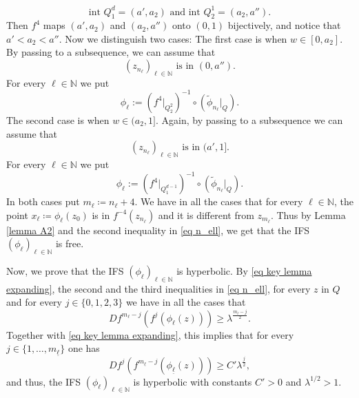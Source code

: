 \documentclass[12pt]{amsart}
\numberwithin{equation}{section} %
\numberwithin{figure}{section} %
\theoremstyle{plain}
\theoremstyle{definition}
\theoremstyle{remark}
\theoremstyle{citing}
\newcommand{\N}{\mathbb{N}}
\renewcommand{\=}{\coloneqq}
\begin{document}
    \begin{equation}
        \text{int } Q_1^d = (a',a_2) \text{ and }\text{int }Q_2^1=(a_2,a''). 
    \end{equation}
    Then $f^4$ maps $(a',a_2)$ and $(a_2,a'')$ onto $(0,1)$ bijectively, and notice that $a'<a_2<a''$. Now we distinguish two cases: The first case is when $w\in[0,a_2]$. By passing to a subsequence, we can assume that
    \begin{equation}
        (z_{n_\ell})_{\ell\in\N} \text{ is in } (0,a'').
    \end{equation}
    For every $\ell\in\N$ we put
    \begin{equation}
        \phi_\ell:= (f^4|_{Q_2^2})^{-1}\circ (\widetilde{\phi}_{n_\ell}|_Q).
    \end{equation}
    The second case is when $w\in (a_2,1]$. Again, by passing to a subsequence we can assume that 
    \begin{equation}
        (z_{n_\ell})_{\ell\in\N} \text{ is in }(a',1].
    \end{equation}
    For every $\ell\in\N$ we put
    \begin{equation}
        \phi_\ell:= (f^4|_{Q_1^{d-1}})^{-1}\circ (\widetilde{\phi}_{n_\ell}|_Q).
    \end{equation}
In both cases put $m_\ell\=n_\ell +4$. We have in all the cases that for every $\ell\in\N$, the point $x_\ell \= \phi_\ell(z_0)$ is in $f^{-4}(z_{n_\ell})$ and it is different from $z_{m_\ell}$. Thus by Lemma \ref{lemma A2} and the second inequality in \eqref{eq n_ell}, we get that the IFS $(\phi_\ell)_{\ell\in\N}$ is free.

Now, we prove that the IFS $(\phi_\ell)_{\ell\in\N}$ is hyperbolic. By 
\eqref{eq key lemma expanding}, the second and the third inequalities in \eqref{eq n_ell}, for every $z$ in $Q$ and for every $j\in\{0,1,2,3\}$ we have in all the cases that 
\begin{equation}
    Df^{m_\ell -j}(f^j(\phi_\ell(z))) \geq \lambda^{\frac{m_\ell-j}{2}}.
\end{equation}
Together with \eqref{eq key lemma expanding}, this implies that for every $j\in\{1,\ldots,m_{\underline{\ell}}\}$ one has
\begin{equation}
    Df^j(f^{m_{\underline{\ell}}-j}(\phi_{\underline{\ell}}(z)))\geq C'\lambda ^{\frac{j}{2}},
\end{equation}
and thus, the IFS $(\phi_{\ell})_{\ell\in\N}$ is hyperbolic with constants $C'>0$ and $\lambda^{1/2}>1$.
\end{document}
